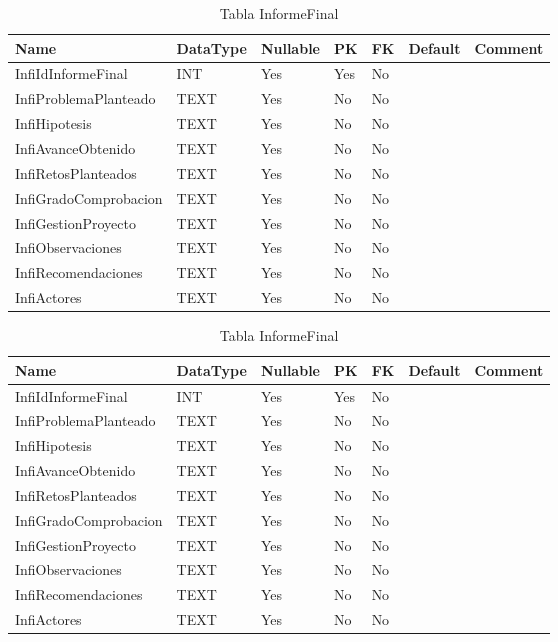 \begin{table}
	\caption{Tabla InformeFinal}
	\label{labelTableInformeFinal}
	\begin{tabular}{ |l|l|l|l|l|l|l| }
		\hline
		Name & DataType & Nullable & PK & FK & Default & Comment \\ \hline
		InfiIdInformeFinal & INT & Yes & Yes & No &  & \\ \hline 
		InfiProblemaPlanteado & TEXT & Yes & No & No &  & \\ \hline 
		InfiHipotesis & TEXT & Yes & No & No &  & \\ \hline 
		InfiAvanceObtenido & TEXT & Yes & No & No &  & \\ \hline 
		InfiRetosPlanteados & TEXT & Yes & No & No &  & \\ \hline 
		InfiGradoComprobacion & TEXT & Yes & No & No &  & \\ \hline 
		InfiGestionProyecto & TEXT & Yes & No & No &  & \\ \hline 
		InfiObservaciones & TEXT & Yes & No & No &  & \\ \hline 
		InfiRecomendaciones & TEXT & Yes & No & No &  & \\ \hline 
		InfiActores & TEXT & Yes & No & No &  & \\ \hline 
		
	\end{tabular}
\end{table}


\begin{table}
	\caption{Tabla InformeFinal}
	\label{labelTableInformeFinal}
	\begin{tabular}{ |l|l|l|l|l|l|l| }
		\hline
		Name & DataType & Nullable & PK & FK & Default & Comment \\ \hline
		InfiIdInformeFinal & INT & Yes & Yes & No &  & \\ \hline 
		InfiProblemaPlanteado & TEXT & Yes & No & No &  & \\ \hline 
		InfiHipotesis & TEXT & Yes & No & No &  & \\ \hline 
		InfiAvanceObtenido & TEXT & Yes & No & No &  & \\ \hline 
		InfiRetosPlanteados & TEXT & Yes & No & No &  & \\ \hline 
		InfiGradoComprobacion & TEXT & Yes & No & No &  & \\ \hline 
		InfiGestionProyecto & TEXT & Yes & No & No &  & \\ \hline 
		InfiObservaciones & TEXT & Yes & No & No &  & \\ \hline 
		InfiRecomendaciones & TEXT & Yes & No & No &  & \\ \hline 
		InfiActores & TEXT & Yes & No & No &  & \\ \hline 
		
	\end{tabular}
\end{table}


